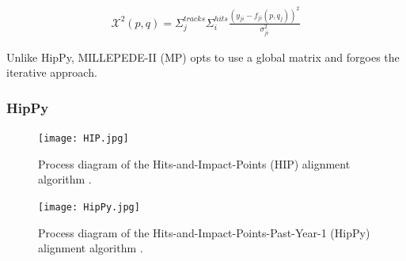 \begin{equation}
\label{eq:MPX2}
\begin{gathered}
\mathcal{X} ^2 (p, q) = \Sigma_j^{tracks} \Sigma_i^{hits} \frac{(y_{ji} - f_{ji}(p, q_j))^2}{\sigma_{ji}^2}
\end{gathered}
\end{equation}

Unlike HipPy, MILLEPEDE-II (MP) opts to use a global matrix and forgoes the iterative approach.

\subsubsection{HipPy}

\begin{figure}[!htb]
    \begin{center}
        \texttt{[image: HIP.jpg]}
        \caption{Process diagram of the Hits-and-Impact-Points (HIP) alignment algorithm \cite{2022166795}.}
        \label{fig:HIP}
    \end{center}
\end{figure}

\begin{figure}[!htb]
    \begin{center}
        \texttt{[image: HipPy.jpg]}
        \caption{Process diagram of the Hits-and-Impact-Points-Past-Year-1 (HipPy) alignment algorithm \cite{2022166795}.}
        \label{fig:HipPy}
    \end{center}
\end{figure}




